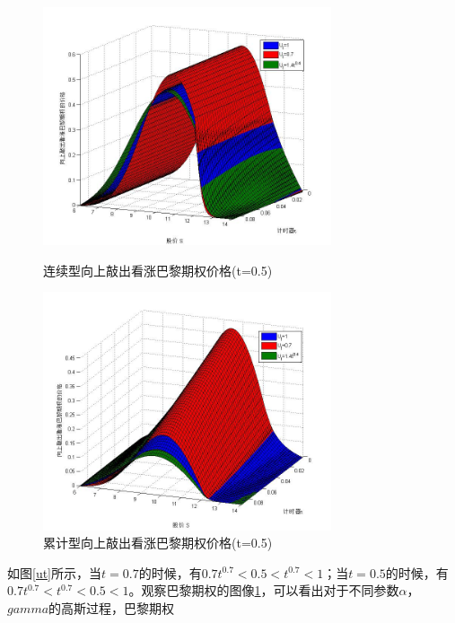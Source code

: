 \documentclass{ctexart} %
\begin{document}
\begin{figure}[H]
\label{mg2}
\begin{minipage}{0.48\linewidth}
\includegraphics[width=8.5cm]{code/mg2.jpg}
\caption{连续型向上敲出看涨巴黎期权价格(t=0.5)}
\end{minipage}
\begin{minipage}{0.48\linewidth}
\includegraphics[width=8.5cm]{code/mc2.jpg}
\caption{累计型向上敲出看涨巴黎期权价格(t=0.5)}
\end{minipage}
\end{figure}
如图\ref{ut}所示，当$t=0.7$的时候，有$0.7t^0.7<0.5<t^{0.7}<1$；当$t=0.5$的时候，有$0.7t^0.7<t^0.7<0.5<1$。观察巴黎期权的图像\ref{mg2}，可以看出对于不同参数$\alpha$，$gamma$的高斯过程，巴黎期权
\end{document}
